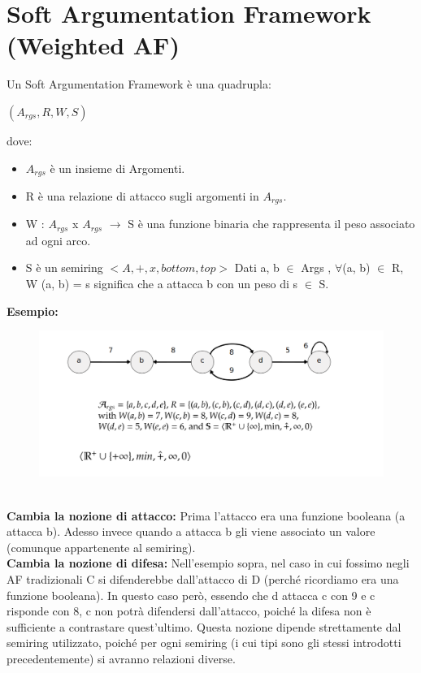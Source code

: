 \section{Soft Argumentation Framework (Weighted AF)}
Un Soft Argumentation Framework è una quadrupla:
\begin{center}
    $(A_{rgs} , R, W, S)$
\end{center}
dove:
\begin{itemize}
    \item $A_{rgs}$ è un insieme di Argomenti.
    \item R è una relazione di attacco sugli argomenti in $A_{rgs}$.
    \item W : $A_{rgs}$ x $A_{rgs}$ $\rightarrow$ S è una funzione binaria che
          rappresenta il peso associato ad ogni arco.
    \item S è un semiring $< A, +, x, bottom, top >$ Dati a, b $\in$ Args ,
          $\forall$(a, b) $\in$ R, W (a, b) = s significa che a attacca b con un peso
          di s $\in$ S.
\end{itemize}
\newpage
\textbf{ Esempio:}
\begin{figure}[htp]
    \centering
    \includegraphics[width=14cm, keepaspectratio]{img/Cap6/SoftA2.png}
\end{figure}
\\\textbf{Cambia la nozione di attacco:} Prima l'attacco era una funzione
booleana (a attacca b). Adesso invece quando a attacca b gli viene associato un
valore (comunque appartenente al semiring). \\\textbf{Cambia la nozione di
    difesa:} Nell'esempio sopra, nel caso in cui fossimo negli AF tradizionali C si
difenderebbe dall'attacco di D (perché ricordiamo era una funzione booleana). In
questo caso però, essendo che d attacca c con 9 e c risponde con 8, c non potrà
difendersi dall'attacco, poiché la difesa non è sufficiente a contrastare
quest'ultimo. Questa nozione dipende strettamente dal semiring utilizzato,
poiché per ogni semiring (i cui tipi sono gli stessi introdotti precedentemente)
si avranno relazioni diverse.
